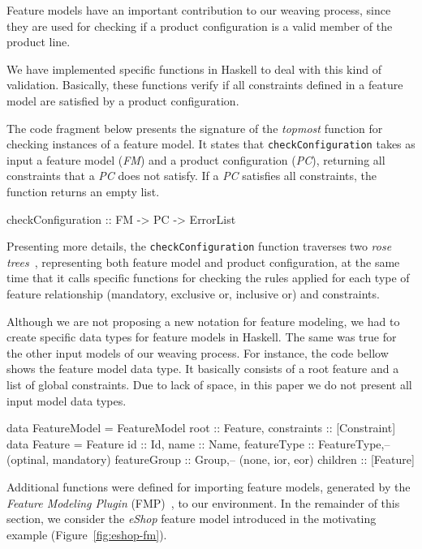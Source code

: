 Feature models have an important contribution to our weaving process, since they
are used for checking if a product configuration is a valid member of the product
line. {\color{red}We have implemented specific functions in Haskell to deal with
this kind of validation. Basically, these functions verify if all constraints defined in
a feature model are satisfied by a product configuration. 

The code fragment below presents the signature of the \emph{topmost} function
for checking instances of a feature model. It states that
\texttt{checkConfiguration} takes as input a feature model (\emph{FM}) and a
product configuration (\emph{PC}), returning all constraints that a
\emph{PC} does not satisfy. If a \emph{PC} satisfies all constraints, the
function returns an empty list.

\begin{code}
checkConfiguration :: FM -> PC -> ErrorList
\end{code}

Presenting more details, the \texttt{checkConfiguration} function traverses two
\emph{rose trees}~\cite{Hinze:2007aa}, representing both feature model and
product configuration, at the same time that it calls specific functions for
checking the rules applied for each type of feature relationship
(mandatory, exclusive or, inclusive or) and constraints. 

Although we are not proposing a new notation for feature modeling, we
had to create specific data types for feature models in Haskell.  The same was
true for the other input models of our weaving process. For instance, the code
bellow shows the feature model data type. It basically consists of a root feature
and a list of global constraints. Due to lack of space, in this paper we do not
present all input model data types.

\begin{code}
data FeatureModel = FeatureModel {
	root :: Feature,
	constraints :: [Constraint]
} 
data Feature = Feature  { 
  id :: Id, 
  name :: Name, 
  featureType :: FeatureType,-- (optinal, mandatory)
  featureGroup :: Group,-- (none, ior, eor)
  children :: [Feature]
} 
 \end{code}
 
Additional functions were defined for importing feature models, generated by the
\emph{Feature Modeling Plugin} (FMP)~\cite{Czarnecki:2004aa}, to our
environment. In the remainder of this section, we consider the \emph{eShop}
feature model introduced in the motivating example (Figure~\ref{fig:eshop-fm}). }

